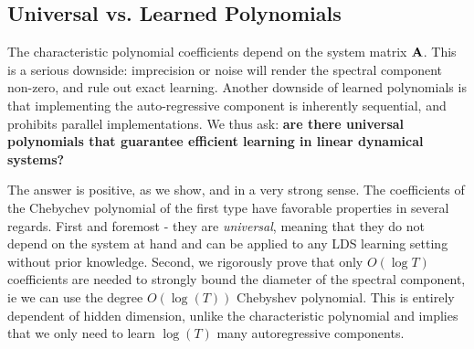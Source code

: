 \subsection{Universal vs. Learned Polynomials}

The characteristic polynomial coefficients depend on the system matrix $\mathbf{A}$. This is a serious downside: imprecision or noise will render the spectral component non-zero, and rule out exact learning. Another downside of learned polynomials is that implementing the auto-regressive component is inherently sequential, and prohibits parallel implementations. We thus ask: {\bf are there universal polynomials that guarantee efficient learning in linear dynamical systems?} 

The answer is positive, as we show, and in a very strong sense. The coefficients of the Chebychev polynomial of the first type have favorable properties in several regards. First and foremost - they are {\it universal}, meaning that they do not depend on the system at hand and can be applied to any LDS learning setting without prior knowledge. Second, we rigorously prove that only $O(\log T)$ coefficients are needed to strongly bound the diameter of the spectral component, ie we can use the degree $O(\log(T))$ Chebyshev polynomial. This is entirely dependent of hidden dimension, unlike the characteristic polynomial and implies that we only need to learn $\log(T)$ many autoregressive components.

